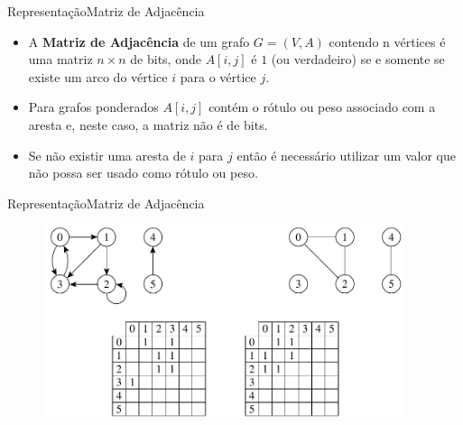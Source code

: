 \documentclass[aspectratio=169]{beamer}
\begin{document}
\begin{frame}{Representação}{Matriz de Adjacência}
\begin{itemize}
\item A {\bf Matriz de Adjacência} de um grafo $G = (V, A)$ contendo n vértices é uma matriz $n \times n$ de bits, onde $A[i, j]$ é $1$ (ou verdadeiro) se e somente se existe um arco do vértice $i$ para o vértice $j$.
\item Para grafos ponderados $A[i, j]$ contém o rótulo ou peso associado com a aresta e, neste caso, a matriz não é de bits.
\item Se não existir uma aresta de $i$ para $j$ então é necessário utilizar um valor que não possa ser usado como rótulo ou peso.
\end{itemize}
\end{frame}


\begin{frame}{Representação}{Matriz de Adjacência}
\begin{figure}[!h]
  \centering
  \includegraphics[width=300pt]{imagens/exemplo_matriz_adjacencia.png}
  \label{fig_exemplo_matriz_adjacencia}
\end{figure}
\end{frame}

\end{document}
